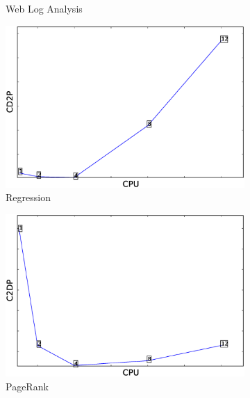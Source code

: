 \begin{figure}
\begin{subfigure}[b]{0.3\textwidth}
        \caption{Web Log Analysis}
        \label{fig:webloganalysis_cd2p}
    \end{subfigure}
    \begin{subfigure}[b]{0.3\textwidth}
        \includegraphics[width=\textwidth]{Chapter-8/figures/regression_cpu_CD2P_12_1.eps}
        \caption{Regression}
        \label{fig:regression_cd2p}
    \end{subfigure}
    \bigskip
    \begin{subfigure}[b]{0.3\textwidth}
        \includegraphics[width=\textwidth]{Chapter-8/figures/pagerank_cpu_C2DP_12_1.eps}
        \caption{PageRank}
        \label{fig:pagerank_c2dp}
    \end{subfigure}
    \begin{subfigure}[b]{0.3\textwidth}

\end{subfigure}
\end{figure}
